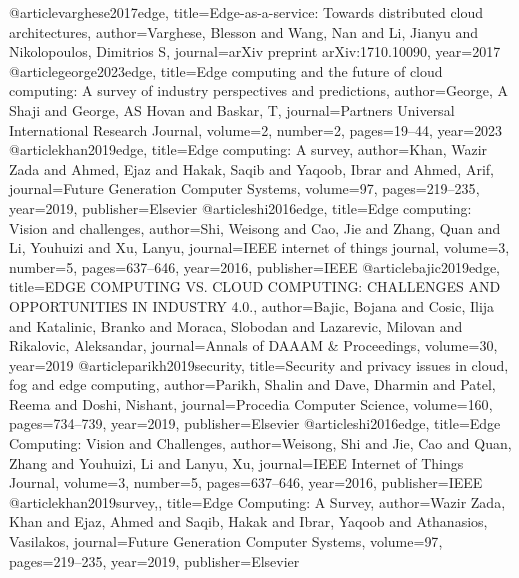 \documentclass[conference]{IEEEtran}
\begin{document}
\begin{thebibliography}{00}
@article{varghese2017edge,
	title={Edge-as-a-service: Towards distributed cloud architectures},
	author={Varghese, Blesson and Wang, Nan and Li, Jianyu and Nikolopoulos, Dimitrios S},
	journal={arXiv preprint arXiv:1710.10090},
	year={2017}
}
@article{george2023edge,
	title={Edge computing and the future of cloud computing: A survey of industry perspectives and predictions},
	author={George, A Shaji and George, AS Hovan and Baskar, T},
	journal={Partners Universal International Research Journal},
	volume={2},
	number={2},
	pages={19--44},
	year={2023}
}
@article{khan2019edge,
	title={Edge computing: A survey},
	author={Khan, Wazir Zada and Ahmed, Ejaz and Hakak, Saqib and Yaqoob, Ibrar and Ahmed, Arif},
	journal={Future Generation Computer Systems},
	volume={97},
	pages={219--235},
	year={2019},
	publisher={Elsevier}
}
@article{shi2016edge,
	title={Edge computing: Vision and challenges},
	author={Shi, Weisong and Cao, Jie and Zhang, Quan and Li, Youhuizi and Xu, Lanyu},
	journal={IEEE internet of things journal},
	volume={3},
	number={5},
	pages={637--646},
	year={2016},
	publisher={IEEE}
}
@article{bajic2019edge,
	title={EDGE COMPUTING VS. CLOUD COMPUTING: CHALLENGES AND OPPORTUNITIES IN INDUSTRY 4.0.},
	author={Bajic, Bojana and Cosic, Ilija and Katalinic, Branko and Moraca, Slobodan and Lazarevic, Milovan and Rikalovic, Aleksandar},
	journal={Annals of DAAAM \& Proceedings},
	volume={30},
	year={2019}
}
@article{parikh2019security,
	title={Security and privacy issues in cloud, fog and edge computing},
	author={Parikh, Shalin and Dave, Dharmin and Patel, Reema and Doshi, Nishant},
	journal={Procedia Computer Science},
	volume={160},
	pages={734--739},
	year={2019},
	publisher={Elsevier}
}
@article{shi2016edge,
	title={Edge Computing: Vision and Challenges},
	author={Weisong, Shi and Jie, Cao and Quan, Zhang and Youhuizi, Li and Lanyu, Xu},
	journal={IEEE Internet of Things Journal},
	volume={3},
	number={5},
	pages={637--646},
	year={2016},
	publisher={IEEE}
}
@article{khan2019survey,,
	title={Edge Computing: A Survey},
	author={Wazir Zada, Khan and Ejaz, Ahmed and Saqib, Hakak and Ibrar, Yaqoob and Athanasios, Vasilakos},
	journal={Future Generation Computer Systems},
	volume={97},
	pages={219--235},
	year={2019},
	publisher={Elsevier}
}
\end{thebibliography}
\end{document}
